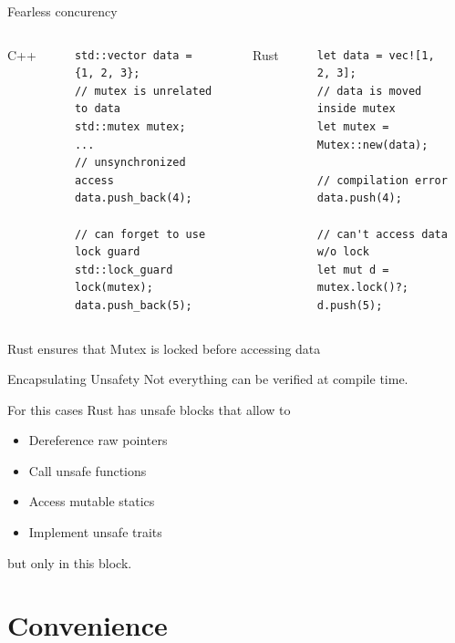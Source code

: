 \documentclass{beamer}
\begin{document}
    \begin{frame}[fragile]{Fearless concurency}
        \vfill
        \begin{columns}
            C++
            \vfill
            \noindent\rule{\textwidth}{1pt}
            \small\begin{verbatim}
std::vector data = {1, 2, 3};
// mutex is unrelated to data
std::mutex mutex;
...
// unsynchronized access
data.push_back(4);

// can forget to use lock guard
std::lock_guard lock(mutex);
data.push_back(5);
            \end{verbatim}
            \noindent\rule{\textwidth}{1pt}
            Rust
            \vfill
            \noindent\rule{\textwidth}{1pt}
            \small\begin{verbatim}
let data = vec![1, 2, 3];
// data is moved inside mutex
let mutex = Mutex::new(data);

// compilation error
data.push(4);

// can't access data w/o lock
let mut d = mutex.lock()?;
d.push(5);
            \end{verbatim}
            \noindent\rule{\textwidth}{1pt}
        \end{columns}
        Rust ensures that Mutex is locked before accessing data
    \end{frame}

    \begin{frame}{Encapsulating Unsafety}
        Not everything can be verified at compile time.

        For this cases Rust has unsafe blocks that allow to
        \begin{itemize}
            \item Dereference raw pointers
            \item Call unsafe functions
            \item Access mutable statics
            \item Implement unsafe traits
        \end{itemize}
        but only in this block.
    \end{frame}

\section{Convenience}
\end{document}
